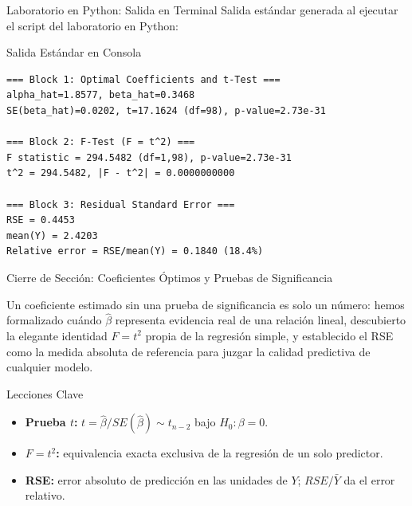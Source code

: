 \documentclass[10pt, aspectratio=169]{beamer}
\begin{document}
\begin{frame}[fragile]{Laboratorio en Python: Salida en Terminal}
  \scriptsize
  Salida estándar generada al ejecutar el script del laboratorio en Python:
  \vspace{0.02cm}
  \begin{block}{Salida Estándar en Consola}
    \fontsize{3.6pt}{4.3pt}\selectfont
    \begin{verbatim}
=== Block 1: Optimal Coefficients and t-Test ===
alpha_hat=1.8577, beta_hat=0.3468
SE(beta_hat)=0.0202, t=17.1624 (df=98), p-value=2.73e-31

=== Block 2: F-Test (F = t^2) ===
F statistic = 294.5482 (df=1,98), p-value=2.73e-31
t^2 = 294.5482, |F - t^2| = 0.0000000000

=== Block 3: Residual Standard Error ===
RSE = 0.4453
mean(Y) = 2.4203
Relative error = RSE/mean(Y) = 0.1840 (18.4%)
    \end{verbatim}
  \end{block}
\end{frame}

\begin{frame}{Cierre de Sección: Coeficientes Óptimos y Pruebas de Significancia}
  \begin{reflexion}
    Un coeficiente estimado sin una prueba de significancia es solo un número: hemos formalizado cuándo $\hat\beta$ representa evidencia real de una relación lineal, descubierto la elegante identidad $F=t^2$ propia de la regresión simple, y establecido el RSE como la medida absoluta de referencia para juzgar la calidad predictiva de cualquier modelo.
  \end{reflexion}

  \vspace{0.2cm}
  \pause
  \begin{block}{Lecciones Clave}
    \begin{itemize}\itemsep=0.08cm
      \item \textbf{Prueba $t$:} $t=\hat\beta/SE(\hat\beta)\sim t_{n-2}$ bajo $H_0:\beta=0$.
      \item \textbf{$F=t^2$:} equivalencia exacta exclusiva de la regresión de un solo predictor.
      \item \textbf{RSE:} error absoluto de predicción en las unidades de $Y$; $RSE/\bar Y$ da el error relativo.
    \end{itemize}
  \end{block}
\end{frame}
\end{document}
